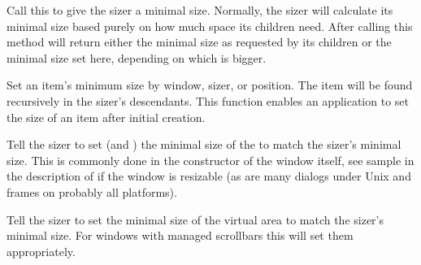 Call this to give the sizer a minimal size. Normally, the sizer will calculate its
minimal size based purely on how much space its children need. After calling this
method  will return either the minimal size
as requested by its children or the minimal size set here, depending on which is
bigger.


\label{wxsizersetitemminsize}




Set an item's minimum size by window, sizer, or position. The item will be found recursively
in the sizer's descendants. This function enables an application to set the size of an item
after initial creation.


\label{wxsizersetsizehints}


Tell the sizer to set (and ) the minimal size of the  to
match the sizer's minimal size.  This is commonly done in the constructor of the window itself,
see sample in the description of  if the window is resizable
(as are many dialogs under Unix and frames on probably all platforms).


\label{wxsizersetvirtualsizehints}


Tell the sizer to set the minimal size of the  virtual area to match the sizer's
minimal size. For windows with managed scrollbars this will set them appropriately.




\label{wxsizershow}


